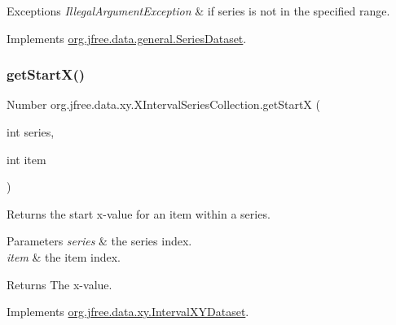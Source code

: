 \begin{DoxyExceptions}{Exceptions}
{\em Illegal\+Argument\+Exception} & if {\ttfamily series} is not in the specified range. \\
\hline
\end{DoxyExceptions}


Implements \mbox{\hyperlink{interfaceorg_1_1jfree_1_1data_1_1general_1_1_series_dataset_a60488892b2314a05a012999e26a74178}{org.\+jfree.\+data.\+general.\+Series\+Dataset}}.

\mbox{\label{classorg_1_1jfree_1_1data_1_1xy_1_1_x_interval_series_collection_a253894bbb8b5b711cb26a9a13f776bc7}} 
\subsubsection{\texorpdfstring{get\+Start\+X()}{getStartX()}}
{\footnotesize\ttfamily Number org.\+jfree.\+data.\+xy.\+X\+Interval\+Series\+Collection.\+get\+StartX (\begin{DoxyParamCaption}\item[{int}]{series,  }\item[{int}]{item }\end{DoxyParamCaption})}

Returns the start x-\/value for an item within a series.


\begin{DoxyParams}{Parameters}
{\em series} & the series index. \\
\hline
{\em item} & the item index.\\
\hline
\end{DoxyParams}
\begin{DoxyReturn}{Returns}
The x-\/value. 
\end{DoxyReturn}


Implements \mbox{\hyperlink{interfaceorg_1_1jfree_1_1data_1_1xy_1_1_interval_x_y_dataset_a7548ec7d60d72463313dc6f10aceee62}{org.\+jfree.\+data.\+xy.\+Interval\+X\+Y\+Dataset}}.

\mbox{\label{classorg_1_1jfree_1_1data_1_1xy_1_1_x_interval_series_collection_ae637f5eee2dc6bcf67b5c782444db397}} 
